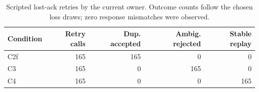\begin{table}[t]\caption{Scripted lost-ack retries by the current owner. Outcome counts follow the chosen loss draws; zero response mismatches were observed.}\label{tab:replay}
\centering\footnotesize\setlength{\tabcolsep}{3.5pt}
\begin{tabular}{lrrrr}\toprule
Condition & Retry calls & Dup. accepted & Ambig. rejected & Stable replay\\\midrule
C2f & 165 & 165 & 0 & 0\\
C3 & 165 & 0 & 165 & 0\\
C4 & 165 & 0 & 0 & 165\\\bottomrule
\end{tabular}
\end{table}
